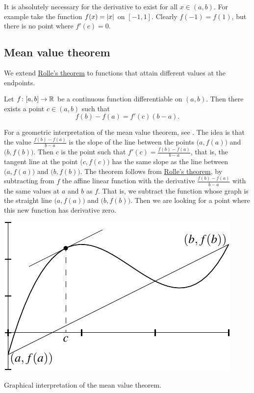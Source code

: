 It is absolutely necessary for the derivative to exist for all $x
\in (a,b)$.  For example take the function $f(x) = \left\lvert {x} \right\rvert$ on $[-1,1]$.
Clearly $f(-1) = f(1)$, but there is no point where $f'(c) = 0$.

\subsection{Mean value theorem}

We extend \hyperref[thm:rolle]{Rolle's theorem}
to functions that attain different
values at the endpoints.

\begin{thm} \label{thm:mvt}
Let $f \colon [a,b] \to {\mathbb{R}}$ be a continuous function
differentiable on $(a,b)$.  Then there exists a point $c \in (a,b)$
such that
\begin{equation*}
f(b)-f(a) = f'(c)(b-a) .
\end{equation*}
\end{thm}

For a geometric interpretation of the mean value theorem, see
.  The idea is that the value $\frac{f(b)-f(a)}{b-a}$
is the slope of the line between the points $\bigl(a,f(a)\bigr)$
and $\bigl(b,f(b)\bigr)$.
Then $c$ is the point such that $f'(c) = \frac{f(b)-f(a)}{b-a}$, that 
is, the tangent line at the point $\bigl(c,f(c)\bigr)$ has the same slope as the
line between $\bigl(a,f(a)\bigr)$ and $\bigl(b,f(b)\bigr)$.
The theorem follows from \hyperref[thm:rolle]{Rolle's theorem},
by subtracting from $f$ the affine linear function with the derivative
$\frac{f(b)-f(a)}{b-a}$ with the same values at $a$ and $b$ as $f$.
That is, we subtract the function whose graph is the straight line
$\bigl(a,f(a)\bigr)$ and $\bigl(b,f(b)\bigr)$.
Then we are looking for a point where this new
function has derivative zero.

\begin{myfigureht}
\includegraphics{figures/mvtfig}
\caption{Graphical interpretation of the mean value theorem.\label{mvtfig}}
\end{myfigureht}


